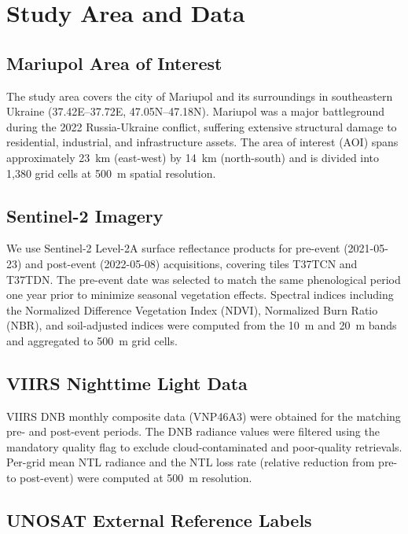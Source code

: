 \documentclass[wcp]{jmlr}
\begin{document}
\section{Study Area and Data}\label{sec:data}

\subsection{Mariupol Area of Interest}

The study area covers the city of Mariupol and its surroundings in
southeastern Ukraine (37.42\textdegree{}E--37.72\textdegree{}E,
47.05\textdegree{}N--47.18\textdegree{}N). Mariupol was a major
battleground during the 2022 Russia-Ukraine conflict, suffering extensive
structural damage to residential, industrial, and infrastructure assets.
The area of interest (AOI) spans approximately 23~km (east-west) by 14~km
(north-south) and is divided into 1{,}380 grid cells at 500~m spatial
resolution.

\subsection{Sentinel-2 Imagery}

We use Sentinel-2 Level-2A surface reflectance products for pre-event
(2021-05-23) and post-event (2022-05-08) acquisitions, covering tiles
T37TCN and T37TDN. The pre-event date was selected to match the same
phenological period one year prior to minimize seasonal vegetation effects.
Spectral indices including the Normalized Difference Vegetation Index
(NDVI), Normalized Burn Ratio (NBR), and soil-adjusted indices were
computed from the 10~m and 20~m bands and aggregated to 500~m grid cells.

\subsection{VIIRS Nighttime Light Data}

VIIRS DNB monthly composite data (VNP46A3) were obtained for the matching
pre- and post-event periods. The DNB radiance values were filtered using the
mandatory quality flag to exclude cloud-contaminated and poor-quality
retrievals. Per-grid mean NTL radiance and the NTL loss rate (relative
reduction from pre- to post-event) were computed at 500~m resolution.

\subsection{UNOSAT External Reference Labels}
\end{document}
